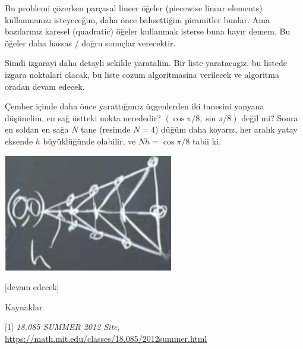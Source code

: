\documentclass[12pt,fleqn]{article}\usepackage{../../common}
\begin{document}
Bu problemi çözerken parçasal lineer öğeler (piecewise linear elements)
kullanmanızı isteyeceğim, daha önce bahsettiğim piramitler bunlar. Ama
bazılarınız karesel (quadratic) öğeler kullanmak isterse buna hayır demem.
Bu öğeler daha hassas / doğru sonuçlar verecektir. 

Simdi izgarayi daha detayli sekilde yaratalim. Bir liste yaratacagiz, bu
listede izgara noktalari olacak, bu liste cozum algoritmasina verilecek
ve algoritma oradan devam edecek.

Çember içinde daha önce yarattığımız üçgenlerden iki tanesini yanyana düşünelim,
en sağ üstteki nokta nerededir? $(\cos \pi/8, \sin \pi/8)$ değil mi? Sonra en
soldan en sağa $N$ tane (resimde $N=4$) düğüm daha koyarız, her aralık yatay
eksende $h$ büyüklüğünde olabilir, ve $N h = \cos\pi/8$ tabii ki.

\includegraphics[width=20em]{compscieng_1_27_03.png}












[devam edecek]

Kaynaklar

[1] {\em 18.085 SUMMER 2012 Site},
    \url{https://math.mit.edu/classes/18.085/2012summer.html}
\end{document}
